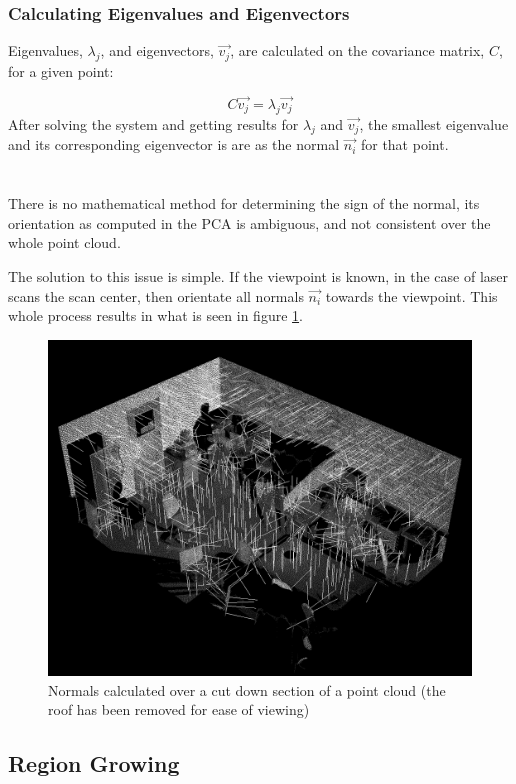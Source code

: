 		\subsubsection{Calculating Eigenvalues and Eigenvectors}
			Eigenvalues, $\lambda_j$, and eigenvectors, $\vec{v_j}$, are calculated on the covariance matrix, $C$, for a given point:
			
			\begin{equation}
			C \vec{v_j} = \lambda_j \vec{v_j}
			\end{equation}
			After solving the system and getting results for $\lambda_j$ and $\vec{v_j}$, the smallest eigenvalue and its corresponding eigenvector is are as the normal $\vec{n_i}$ for that point.\\
			\\
			\\
			There is no mathematical method for determining the sign of the normal, its orientation as computed in the PCA is ambiguous, and not consistent over the whole point cloud. 
			
			The solution to this issue is simple. If the viewpoint is known, in the case of laser scans the scan center, then orientate all normals $\vec{n_i}$ towards the viewpoint. This whole process results in what is seen in figure \ref{fig:Normals}.
			
			\begin{figure}[H]
			\centering
			\includegraphics[width=0.7\linewidth]{Includes/images/Normals}
			\caption{Normals calculated over a cut down section of a point cloud (the roof has been removed for ease of viewing)}
			\label{fig:Normals}
			\end{figure}
		

				
	\subsection{Region Growing}
	
